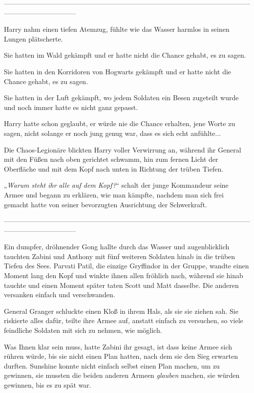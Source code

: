 {--------------------------------------------------------------------------------------------------------------------------------------------

\hfill\break Harry nahm einen tiefen Atemzug, fühlte wie das Wasser harmlos in seinen Lungen plätscherte.

Sie hatten im Wald gekämpft und er hatte nicht die Chance gehabt, es zu sagen.

Sie hatten in den Korridoren von Hogwarts gekämpft und er hatte nicht die Chance gehabt, es zu sagen.

Sie hatten in der Luft gekämpft, wo jedem Soldaten ein Besen zugeteilt wurde und noch immer hatte es nicht ganz gepasst.

Harry hatte schon geglaubt, er würde nie die Chance erhalten, jene Worte zu sagen, nicht solange er noch jung genug war, dass es sich echt anfühlte...

Die Chaos-Legionäre blickten Harry voller Verwirrung an, während ihr General mit den Füßen nach oben gerichtet schwamm, hin zum fernen Licht der Oberfläche und mit dem Kopf nach unten in Richtung der trüben Tiefen.

„\emph{Warum steht ihr} \emph{alle} \emph{auf dem Kopf?}“ schalt der junge Kommandeur seine Armee und begann zu erklären, wie man kämpfte, nachdem man sich frei gemacht hatte von seiner bevorzugten Ausrichtung der Schwerkraft.

--------------------------------------------------------------------------------------------------------------------------------------------

\hfill\break Ein dumpfer, dröhnender Gong hallte durch das Wasser und augenblicklich tauchten Zabini und Anthony mit fünf weiteren Soldaten hinab in die trüben Tiefen des Sees. Parvati Patil, die einzige Gryffindor in der Gruppe, wandte einen Moment lang den Kopf und winkte ihnen allen fröhlich nach, während sie hinab tauchte und einen Moment später taten Scott und Matt dasselbe. Die anderen versanken einfach und verschwanden.

General Granger schluckte einen Kloß in ihrem Hals, als sie sie ziehen sah. Sie riskierte alles dafür, teilte ihre Armee auf, anstatt einfach zu versuchen, so viele feindliche Soldaten mit sich zu nehmen, wie möglich.

Was Ihnen klar sein muss, hatte Zabini ihr gesagt, ist dass keine Armee sich rühren würde, bis sie nicht einen Plan hatten, nach dem sie den Sieg erwarten durften. Sunshine konnte nicht einfach selbst einen Plan machen, um zu gewinnen, sie mussten die beiden anderen Armeen \emph{glauben} machen, sie würden gewinnen, bis es zu spät war.

}
